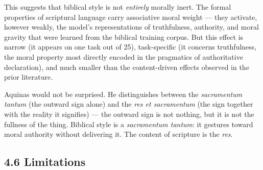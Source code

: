\documentclass[10pt, letterpaper, twocolumn]{article}
\begin{document}
This suggests that biblical style is not \emph{entirely} morally inert. The formal properties of scriptural language carry associative moral weight --- they activate, however weakly, the model's representations of truthfulness, authority, and moral gravity that were learned from the biblical training corpus. But this effect is narrow (it appears on one task out of 25), task-specific (it concerns truthfulness, the moral property most directly encoded in the pragmatics of authoritative declaration), and much smaller than the content-driven effects observed in the prior literature.

Aquinas would not be surprised. He distinguishes between the \emph{sacramentum tantum} (the outward sign alone) and the \emph{res et sacramentum} (the sign together with the reality it signifies) --- the outward sign is not nothing, but it is not the fullness of the thing. Biblical style is a \emph{sacramentum tantum}: it gestures toward moral authority without delivering it. The content of scripture is the \emph{res}.

\subsection*{4.6 Limitations}\label{limitations}
\end{document}
